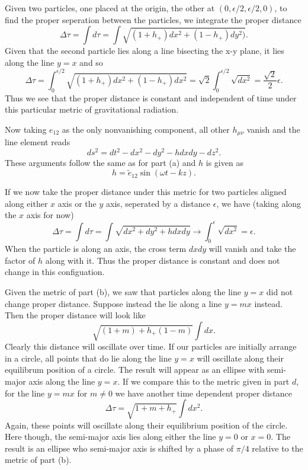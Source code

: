 \documentclass[10pt,letterpaper]{article}
\begin{document}
\item
Given two particles, one placed at the origin, the other at $(0,\epsilon/2, \epsilon/2,0)$, to find the proper seperation between the particles, we integrate the proper distance
\[
	\Delta \tau = \int d\tau = \int \sqrt{ (1+h_+)dx^2 + (1-h_+)dy^2)}.
\]
Given that the second particle lies along a line bisecting the x-y plane, it lies along the line $y=x$ and so
\[
	\Delta \tau = \int_0^{\epsilon/2} \sqrt{(1+h_+)dx^2 + (1-h_+)dx^2} = \sqrt 2 \int_0^{\epsilon/2} \sqrt{dx^2} = \frac{\sqrt 2}{2}\epsilon.
\]
Thus we see that the proper distance is constant and independent of time under this particular metric of gravitational radiation. 
\\
\item
Now taking $e_{12}$ as the only nonvanishing component, all other $h_{\mu\nu}$ vanish and the line element reads
\[
	ds^2 = dt^2 - dx^2 - dy^2 - h dxdy - dz^2.
\]
These arguments follow the same as for part (a) and $h$ is given as
\[
	h = \tilde e_{12}\sin(\omega t-kz).
\]
\item
If we now take the proper distance under this metric for two particles aligned along either $x$ axis or the $y$ axis, seperated by a distance $\epsilon$, we have (taking along the $x$ axis for now)
\[
	\Delta \tau = \int d\tau =\int \sqrt{ dx^2 +dy^2 + hdxdy}\to \int_0^\epsilon \sqrt{dx^2} = \epsilon.
\]
When the particle is along an axis, the cross term $dxdy$ will vanish and take the factor of $h$ along with it. Thus the proper distance is constant and does not change in this configuation. 
\item
Given the metric of part (b), we saw that particles along the line $y=x$ did not change proper distance. Suppose instead the lie along a line $y=mx$ instead. Then the proper distance will look like
\[
	 \sqrt{(1+m)+h_+(1-m)} \int dx.
\]
Clearly this distance will oscillate over time. If our particles are initially arrange in a circle, all points that do lie along the line $y=x$ will oscillate along their equilibrum position of a circle. The result will appear as an ellipse with semi-major axis along the line $y=x$. If we compare this 
to the metric given in part $d$, for the line $y=mx$ for $m\ne 0$ we have another time dependent proper distance
\[
	\Delta \tau = \sqrt{ 1+m+h_+}\int dx^2 .
\]
Again, these points will oscillate along their equilibrium position of the circle. Here though, the semi-major axis lies along either the line $y=0$
or $x=0$. The result is an ellipse who semi-major axis is shifted by a phase of $\pi/4$ relative to the metric of part (b). \newpage
\eenum
\end{document}
